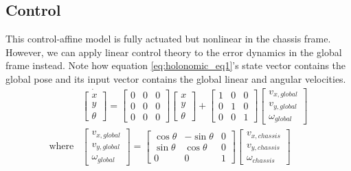 \subsection{Control}

This control-affine model is fully actuated but nonlinear in the chassis frame.
However, we can apply linear control theory to the error dynamics in the global
frame instead. Note how equation \eqref{eq:holonomic_eq1}'s state vector
contains the global pose and its input vector contains the global linear and
angular velocities.
\begin{align}
  &\dot{\begin{bmatrix}
    x \\
    y \\
    \theta
  \end{bmatrix}} =
  \begin{bmatrix}
    0 & 0 & 0 \\
    0 & 0 & 0 \\
    0 & 0 & 0
  \end{bmatrix}
  \begin{bmatrix}
    x \\
    y \\
    \theta
  \end{bmatrix} +
  \begin{bmatrix}
    1 & 0 & 0 \\
    0 & 1 & 0 \\
    0 & 0 & 1
  \end{bmatrix}
  \begin{bmatrix}
    v_{x,global} \\
    v_{y,global} \\
    \omega_{global}
  \end{bmatrix}
  \label{eq:holonomic_eq1} \\
  \text{where}
  &\begin{bmatrix}
    v_{x,global} \\
    v_{y,global} \\
    \omega_{global}
  \end{bmatrix} =
  \begin{bmatrix}
    \cos\theta & -\sin\theta & 0 \\
    \sin\theta & \cos\theta & 0 \\
    0 & 0 & 1
  \end{bmatrix}
  \begin{bmatrix}
    v_{x,chassis} \\
    v_{y,chassis} \\
    \omega_{chassis}
  \end{bmatrix}
  \label{eq:holonomic_eq2}
\end{align}

